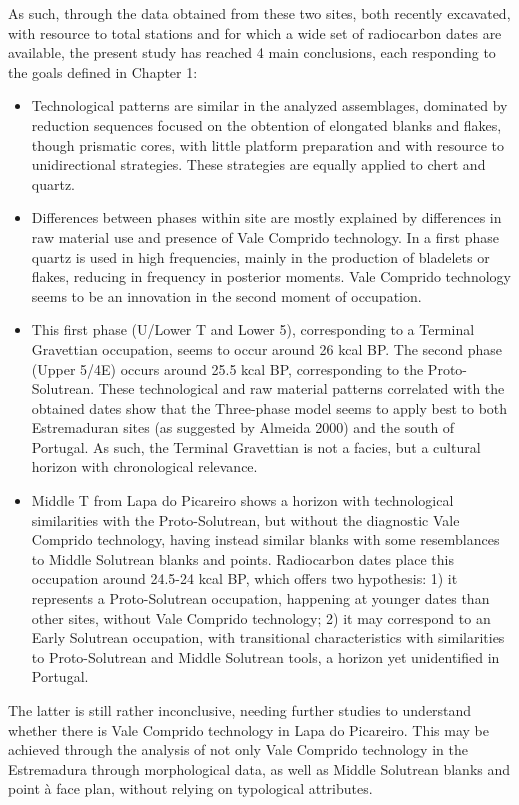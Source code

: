 \documentclass[12pt,twoside]{reedthesis}
\begin{document}
As such, through the data obtained from these two sites, both recently excavated, with resource to total stations and for which a wide set of radiocarbon dates are available, the present study has reached 4 main conclusions, each responding to the goals defined in Chapter 1:
\begin{itemize}
\item
  Technological patterns are similar in the analyzed assemblages, dominated by reduction sequences focused on the obtention of elongated blanks and flakes, though prismatic cores, with little platform preparation and with resource to unidirectional strategies. These strategies are equally applied to chert and quartz.
\item
  Differences between phases within site are mostly explained by differences in raw material use and presence of Vale Comprido technology. In a first phase quartz is used in high frequencies, mainly in the production of bladelets or flakes, reducing in frequency in posterior moments. Vale Comprido technology seems to be an innovation in the second moment of occupation.
\item
  This first phase (U/Lower T and Lower 5), corresponding to a Terminal Gravettian occupation, seems to occur around 26 kcal BP. The second phase (Upper 5/4E) occurs around 25.5 kcal BP, corresponding to the Proto-Solutrean. These technological and raw material patterns correlated with the obtained dates show that the Three-phase model seems to apply best to both Estremaduran sites (as suggested by Almeida 2000) and the south of Portugal. As such, the Terminal Gravettian is not a facies, but a cultural horizon with chronological relevance.
\item
  Middle T from Lapa do Picareiro shows a horizon with technological similarities with the Proto-Solutrean, but without the diagnostic Vale Comprido technology, having instead similar blanks with some resemblances to Middle Solutrean blanks and points. Radiocarbon dates place this occupation around 24.5-24 kcal BP, which offers two hypothesis: 1) it represents a Proto-Solutrean occupation, happening at younger dates than other sites, without Vale Comprido technology; 2) it may correspond to an Early Solutrean occupation, with transitional characteristics with similarities to Proto-Solutrean and Middle Solutrean tools, a horizon yet unidentified in Portugal.
\end{itemize}
The latter is still rather inconclusive, needing further studies to understand whether there is Vale Comprido technology in Lapa do Picareiro. This may be achieved through the analysis of not only Vale Comprido technology in the Estremadura through morphological data, as well as Middle Solutrean blanks and point à face plan, without relying on typological attributes.
\end{document}

